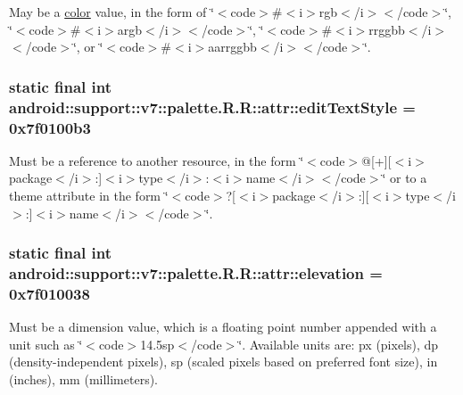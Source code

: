 May be a \hyperlink{classandroid_1_1support_1_1v7_1_1palette_1_1_r_1_1color}{color} value, in the form of \char`\"{}$<$code$>$\#$<$i$>$rgb$<$/i$>$$<$/code$>$\char`\"{}, \char`\"{}$<$code$>$\#$<$i$>$argb$<$/i$>$$<$/code$>$\char`\"{}, \char`\"{}$<$code$>$\#$<$i$>$rrggbb$<$/i$>$$<$/code$>$\char`\"{}, or \char`\"{}$<$code$>$\#$<$i$>$aarrggbb$<$/i$>$$<$/code$>$\char`\"{}. \hypertarget{classandroid_1_1support_1_1v7_1_1palette_1_1_r_1_1attr_c6fb67b1dec715171b248dd15bcb0132}{
\subsubsection[{editTextStyle}]{\setlength{\rightskip}{0pt plus 5cm}static final int android::support::v7::palette.R.R::attr::editTextStyle = 0x7f0100b3}}
\label{classandroid_1_1support_1_1v7_1_1palette_1_1_r_1_1attr_c6fb67b1dec715171b248dd15bcb0132}


Must be a reference to another resource, in the form \char`\"{}$<$code$>$@\mbox{[}+\mbox{]}\mbox{[}$<$i$>$package$<$/i$>$:\mbox{]}$<$i$>$type$<$/i$>$:$<$i$>$name$<$/i$>$$<$/code$>$\char`\"{} or to a theme attribute in the form \char`\"{}$<$code$>$?\mbox{[}$<$i$>$package$<$/i$>$:\mbox{]}\mbox{[}$<$i$>$type$<$/i$>$:\mbox{]}$<$i$>$name$<$/i$>$$<$/code$>$\char`\"{}. \hypertarget{classandroid_1_1support_1_1v7_1_1palette_1_1_r_1_1attr_0b5f7c979ac70d0ddb4742bc53015985}{
\subsubsection[{elevation}]{\setlength{\rightskip}{0pt plus 5cm}static final int android::support::v7::palette.R.R::attr::elevation = 0x7f010038}}
\label{classandroid_1_1support_1_1v7_1_1palette_1_1_r_1_1attr_0b5f7c979ac70d0ddb4742bc53015985}


Must be a dimension value, which is a floating point number appended with a unit such as \char`\"{}$<$code$>$14.5sp$<$/code$>$\char`\"{}. Available units are: px (pixels), dp (density-independent pixels), sp (scaled pixels based on preferred font size), in (inches), mm (millimeters). 

